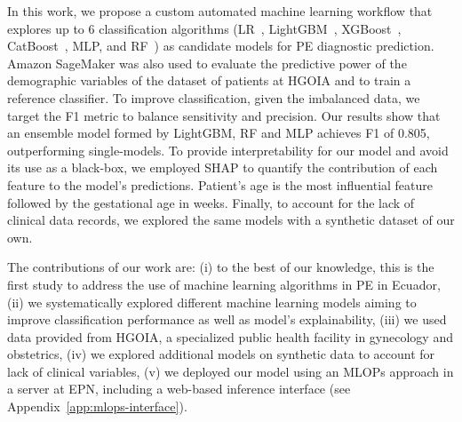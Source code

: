 \documentclass[diagnostics,article,submit,pdftex,moreauthors]{Definitions/mdpi}
\begin{document}
In this work, we propose a custom automated machine learning workflow
that explores up to 6 classification algorithms
(\ac{LR}~\cite{cox1958logistic}, LightGBM~\cite{ke2017lightgbm},
XGBoost~\cite{chen2016xgboost},
CatBoost~\cite{prokhorenkova2018catboost},
\ac{MLP}\cite{rumelhart1986backprop}, and
\ac{RF}~\cite{breiman2001randomforest}) as candidate models for
\ac{PE} diagnostic prediction. Amazon SageMaker was also used to
evaluate the predictive power of the demographic variables of the
dataset of patients at \ac{HGOIA} and to train a reference
classifier. To improve classification, given the imbalanced data, we
target the \ac{F1} metric to balance sensitivity and precision. Our
results show that an ensemble model formed by LightGBM, \ac{RF} and
\ac{MLP} achieves \ac{F1} of 0.805, outperforming single-models. To
provide interpretability for our model and avoid its use as a
black-box, we employed \ac{SHAP} to quantify the contribution of each
feature to the model's predictions. Patient's age is the most
influential feature followed by the gestational age in weeks. Finally,
to account for the lack of clinical data records, we explored the same
models with a synthetic dataset of our own.

The contributions of our work are: (i) to the best of our knowledge,
this is the first study to address the use of machine
learning algorithms in \ac{PE} in Ecuador, (ii) we systematically
explored different machine learning models aiming to improve
classification performance as well as model's explainability, (iii) we
used data provided from \ac{HGOIA}, a specialized
public health facility in gynecology and obstetrics, (iv) we explored
additional models on synthetic data to account for lack of clinical
variables, (v) we deployed our model using an \ac{MLOPs} approach in a
server at \ac{EPN}, including a web-based inference interface (see
Appendix~\ref{app:mlops-interface}).
\end{document}
